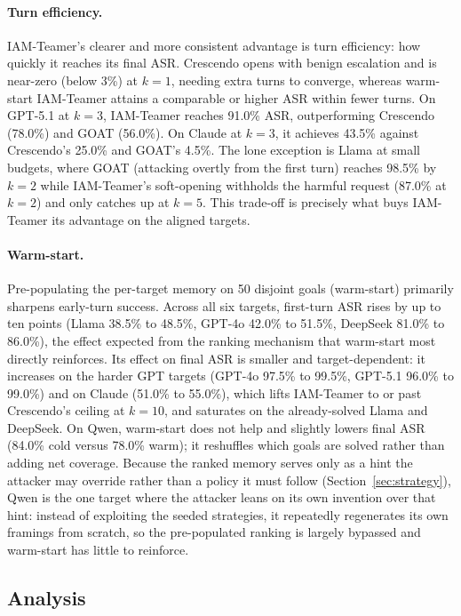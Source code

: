 \documentclass[a4paper,fleqn]{cas-sc}
\begin{document}
\paragraph{Turn efficiency.}
IAM-Teamer's clearer and more consistent advantage is turn efficiency: how quickly it reaches its final ASR.
Crescendo opens with benign escalation and is near-zero (below 3\%) at $k=1$, needing extra turns to converge, whereas warm-start IAM-Teamer attains a comparable or higher ASR within fewer turns.
On GPT-5.1 at $k=3$, IAM-Teamer reaches 91.0\% ASR, outperforming Crescendo (78.0\%) and GOAT (56.0\%). On Claude at $k=3$, it achieves 43.5\% against Crescendo's 25.0\% and GOAT's 4.5\%.
The lone exception is Llama at small budgets, where GOAT (attacking overtly from the first turn) reaches 98.5\% by $k=2$ while IAM-Teamer's soft-opening withholds the harmful request (87.0\% at $k=2$) and only catches up at $k=5$.
This trade-off is precisely what buys IAM-Teamer its advantage on the aligned targets.

\paragraph{Warm-start.}
Pre-populating the per-target memory on 50 disjoint goals (warm-start) primarily sharpens early-turn success.
Across all six targets, first-turn ASR rises by up to ten points (Llama 38.5\% to 48.5\%, GPT-4o 42.0\% to 51.5\%, DeepSeek 81.0\% to 86.0\%), the effect expected from the ranking mechanism that warm-start most directly reinforces.
Its effect on final ASR is smaller and target-dependent: it increases on the harder GPT targets (GPT-4o 97.5\% to 99.5\%, GPT-5.1 96.0\% to 99.0\%) and on Claude (51.0\% to 55.0\%), which lifts IAM-Teamer to or past Crescendo's ceiling at $k=10$, and saturates on the already-solved Llama and DeepSeek.
On Qwen, warm-start does not help and slightly lowers final ASR (84.0\% cold versus 78.0\% warm); it reshuffles which goals are solved rather than adding net coverage.
Because the ranked memory serves only as a hint the attacker may override rather than a policy it must follow (Section~\ref{sec:strategy}), Qwen is the one target where the attacker leans on its own invention over that hint: instead of exploiting the seeded strategies, it repeatedly regenerates its own framings from scratch, so the pre-populated ranking is largely bypassed and warm-start has little to reinforce.

\FloatBarrier

\subsection{Analysis}
\label{sec:analysis}
\end{document}

